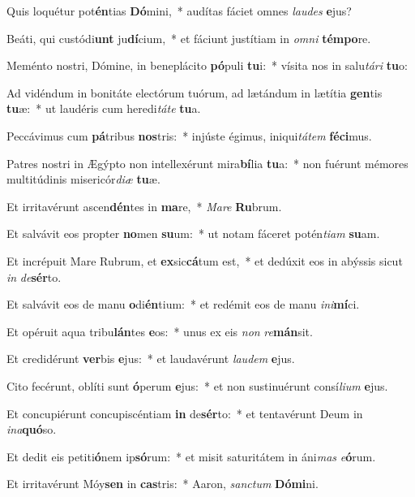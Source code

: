 \item Quis loquétur pot\textbf{én}tias \textbf{Dó}mini,~* audítas fáciet omnes \textit{lau}\textit{des} \textbf{e}jus?
\item Beáti, qui custódi\textbf{unt} ju\textbf{dí}cium,~* et fáciunt justítiam in \textit{om}\textit{ni} \textbf{tém}\textbf{po}re.
\item Meménto nostri, Dómine, in beneplácito \textbf{pó}puli \textbf{tu}i:~* vísita nos in salu\textit{tá}\textit{ri} \textbf{tu}o:
\item Ad vidéndum in bonitáte electórum tuórum, ad lætándum in lætítia \textbf{gen}tis \textbf{tu}æ:~* ut laudéris cum heredi\textit{tá}\textit{te} \textbf{tu}a.
\item Peccávimus cum \textbf{pá}tribus \textbf{nos}tris:~* injúste égimus, iniqui\textit{tá}\textit{tem} \textbf{fé}\textbf{ci}mus.
\item Patres nostri in Ægýpto non intellexérunt mira\textbf{bí}lia \textbf{tu}a:~* non fuérunt mémores multitúdinis misericór\textit{di}\textit{æ} \textbf{tu}æ.
\item Et irritavérunt ascen\textbf{dén}tes in \textbf{ma}re,~* \textit{Ma}\textit{re} \textbf{Ru}brum.
\item Et salvávit eos propter \textbf{no}men \textbf{su}um:~* ut notam fáceret potén\textit{ti}\textit{am} \textbf{su}am.
\item Et incrépuit Mare Rubrum, et \textbf{ex}sic\textbf{cá}tum est,~* et dedúxit eos in abýssis sicut \textit{in} \textit{de}\textbf{sér}to.
\item Et salvávit eos de manu \textbf{o}di\textbf{én}tium:~* et redémit eos de manu \textit{in}\textit{i}\textbf{mí}ci.
\item Et opéruit aqua tribu\textbf{lán}tes \textbf{e}os:~* unus ex eis \textit{non} \textit{re}\textbf{mán}sit.
\item Et credidérunt \textbf{ver}bis \textbf{e}jus:~* et laudavérunt \textit{lau}\textit{dem} \textbf{e}jus.
\item Cito fecérunt, oblíti sunt \textbf{ó}perum \textbf{e}jus:~* et non sustinuérunt consí\textit{li}\textit{um} \textbf{e}jus.
\item Et concupiérunt concupiscéntiam \textbf{in} de\textbf{sér}to:~* et tentavérunt Deum in \textit{in}\textit{a}\textbf{quó}so.
\item Et dedit eis petiti\textbf{ó}nem ip\textbf{só}rum:~* et misit saturitátem in áni\textit{mas} \textit{e}\textbf{ó}rum.
\item Et irritavérunt Móy\textbf{sen} in \textbf{cas}tris:~* Aaron, \textit{sanc}\textit{tum} \textbf{Dó}\textbf{mi}ni.

